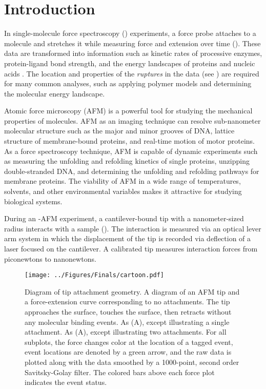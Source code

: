 \chapter{Introduction}
In single-molecule force spectroscopy (\singlemol{}) experiments, a force probe attaches to a molecule and stretches it while measuring force and extension over time (). These data are transformed into information such as kinetic rates of processive enzymes, protein-ligand bond strength,  and the energy landscapes of proteins and nucleic acids . The location and properties of the \textit{ruptures} in the data (see ) are required for many common \singlemol{} analyses, such as applying polymer models and determining the molecular energy landscape.

Atomic force microscopy (AFM) is a powerful tool for studying the mechanical properties of molecules.  AFM as an imaging technique can resolve sub-nanometer molecular structure such as the major and minor grooves of DNA, lattice structure of membrane-bound proteins, and real-time motion of motor proteins. As a force spectroscopy technique, AFM is capable of dynamic experiments such as measuring the unfolding and refolding kinetics of single proteins, unzipping double-stranded DNA, and determining the unfolding and refolding pathways for membrane proteins. The viability of AFM in a wide range of temperatures, solvents, and other environmental variables makes it attractive for studying biological systems. 

During an \singlemol{}-AFM experiment, a cantilever-bound tip with a nanometer-sized radius interacts with a sample (). The interaction is measured via an optical lever arm system\cite{meyer_novel_1998} in which the displacement of the tip is recorded via deflection of a laser focused on the cantilever. A calibrated tip measures interaction forces from piconewtons to nanonewtons. 

\begin{figure}[htpb]
\caption[Diagram of AFM attachment geometry]{Diagram of tip attachment geometry.  A diagram of an AFM tip and a force-extension curve corresponding to no attachments. The tip approaches the surface, touches the surface, then retracts without any molecular binding events.  As (A), except illustrating a single attachment.  As (A), except illustrating two attachments. For all subplots, the force changes color at the location of a tagged event, event locations are denoted by a green arrow, and the raw data is plotted along with the data smoothed by a 1000-point, second order Savitsky-Golay filter. The colored bars above each force plot indicates the event status.}
\centering
\texttt{[image: ../Figures/Finals/cartoon.pdf]}%
\end{figure}


